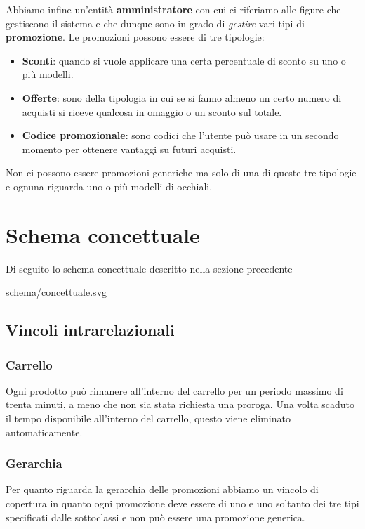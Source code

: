 \documentclass[12pt, a4paper]{article}
\begin{document}
Abbiamo infine un'entità \textbf{amministratore} con cui ci riferiamo alle figure che gestiscono
il sistema e che dunque sono in grado di \emph{gestire} vari tipi di \textbf{promozione}. Le
promozioni possono essere di tre tipologie:
\begin{itemize}
	\item \textbf{Sconti}: quando si vuole applicare una certa percentuale di sconto su uno o più
	      modelli.
	\item \textbf{Offerte}: sono della tipologia in cui se si fanno almeno un certo numero di
	      acquisti si riceve qualcosa in omaggio o un sconto sul totale.
	\item \textbf{Codice promozionale}: sono codici che l'utente può usare in un secondo momento
	      per ottenere vantaggi su futuri acquisti.
\end{itemize}
Non ci possono essere promozioni generiche ma solo di una di queste tre tipologie e ognuna riguarda
uno o più modelli di occhiali.

\section{Schema concettuale}
Di seguito lo schema concettuale descritto nella sezione precedente

 {schema/concettuale.svg}

\subsection{Vincoli intrarelazionali}

\subsubsection{Carrello}
Ogni prodotto può rimanere all'interno del carrello per un periodo massimo di trenta minuti, a
meno che non sia stata richiesta una proroga. Una volta scaduto il tempo disponibile all'interno
del carrello, questo viene eliminato automaticamente.

\subsubsection{Gerarchia}
Per quanto riguarda la gerarchia delle promozioni abbiamo un vincolo di copertura in quanto ogni
promozione deve essere di uno e uno soltanto dei tre tipi specificati dalle sottoclassi e non può
essere una promozione generica.
\end{document}
